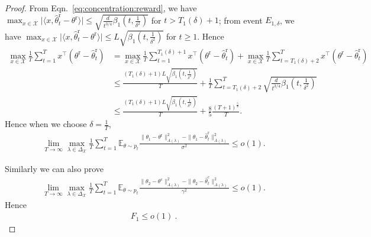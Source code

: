 \documentclass[accepted]{uai2025} %
\theoremstyle{plain}
\theoremstyle{definition}
\theoremstyle{remark}
\newcommand{\thetar}{\theta^{\mathrm{r}}}
\newcommand{\hthetact}{\hat{\theta}_t^{\mathrm{c}}}
\newcommand{\hthetart}{\hat{\theta}_t^{\mathrm{r}}}
\newcommand{\leo}{o} %
\begin{document}
\begin{proof}
From Eqn.~\eqref{eq:concentration:reward}, we have $\max_{x\in \mathcal{X}}\lvert\langle x, \hthetart - \thetar \rangle\rvert \leq \sqrt{\frac{d}{t^{3/4}} \beta_1(t, \frac{1}{\delta^2})}$ for $t>T_1(\delta)+1$; from event $E_{1, \delta}$, we have $\max_{x\in \mathcal{X}}\lvert\langle x, \hthetart - \thetar \rangle\rvert \leq L \sqrt{\beta_1(t, \frac{1}{\delta^2})}$ for $t\ge 1$.
Hence
\begin{align*}
    \max_{x\in\mathcal{X}} \frac{1}{T} \sum_{t=1}^T x^\top(\thetar-\hat{\theta}_t^\mathrm{r})&=\max_{x\in\mathcal{X}} \frac{1}{T} \sum_{t=1}^{T_1(\delta)+1} x^\top(\thetar-\hat{\theta}_t^\mathrm{r})+\max_{x\in\mathcal{X}} \frac{1}{T} \sum_{t=T_1(\delta)+2}^T x^\top(\thetar-\hat{\theta}_t^\mathrm{r})
    \\&\le \frac{(T_1(\delta)+1)L\sqrt{\beta_1(t,\frac{1}{\delta^2})}}{T}+\frac{1}{T} \sum_{t=T_1(\delta)+2}^T \sqrt{\frac{d}{t^{3/4}} \beta_1(t, \frac{1}{\delta^2})}
    \\&\le \frac{(T_1(\delta)+1)L\sqrt{\beta_1(t,\frac{1}{\delta^2})}}{T}+\frac{8}{5} \frac{(T+1)^\frac{5}{8}}{T}.
\end{align*}
Hence when we choose $\delta=\frac{1}{T}$, 
\begin{align*}
    \lim_{T\to \infty}\max_{\lambda \in \Delta_{\mathcal{X}}} \frac{1}{T}\sum_{t=1}^T\mathbb{E}_{\theta \sim {p}_{t}} 
\frac{\|\theta_1 - \theta^\mathrm{r}\|_{A(\lambda)}^2-\|\theta_1 - \hthetart\|_{A(\lambda)}^2}{\sigma^2} \le o(1).
\end{align*}


Similarly  we can also prove
\begin{align*}
    \lim_{T\to \infty}\max_{\lambda \in \Delta_{\mathcal{X}}} \frac{1}{T}\sum_{t=1}^T\mathbb{E}_{\theta \sim {p}_{t}} 
 \frac{\|\theta_2 - \theta^\mathrm{c}\|_{{A}(\lambda)}^2-\|\theta_2 - \hthetact\|_{{A}(\lambda)}^2}{\gamma^2}\le\leo(1).
\end{align*}
Hence
\begin{align}
    F_1\le o(1)~. \nonumber
\end{align}
\end{proof}
\end{document}
